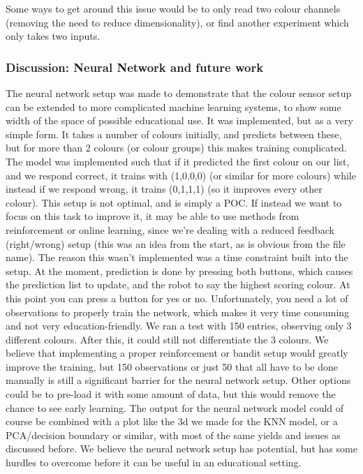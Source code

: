 \documentclass[11pt, a4paper]{article}
\begin{document}
Some ways to get around this issue would be to only read two colour channels (removing the need to reduce dimensionality), or find another experiment which only takes two inputs. 
\subsubsection{Discussion: Neural Network and future work}
The neural network setup was made to demonstrate that the colour sensor setup can be extended to more complicated machine learning systems, to show some width of the space of possible educational use. It was implemented, but as a very simple form. It takes a number of colours initially, and predicts between these, but for more than 2 colours (or colour groups) this makes training complicated. The model was implemented such that if it predicted the first colour on our list, and we respond correct, it trains with (1,0,0,0) (or similar for more colours) while instead if we respond wrong, it trains (0,1,1,1) (so it improves every other colour). This setup is not optimal, and is simply a POC. If instead we want to focus on this task to improve it, it may be able to use methods from reinforcement or online learning, since we're dealing with a reduced feedback (right/wrong) setup (this was an idea from the start, as is obvious from the file name). The reason this wasn't implemented was a time constraint built into the setup. At the moment, prediction is done by pressing both buttons, which causes the prediction list to update, and the robot to say the highest scoring colour. At this point you can press a button for yes or no. Unfortunately, you need a lot of observations to properly train the network, which makes it very time consuming and not very education-friendly. We ran a test with 150 entries, observing only 3 different colours. After this, it could still not differentiate the 3 colours. We believe that implementing a proper reinforcement or bandit setup would greatly improve the training, but 150 observations or just 50 that all have to be done manually is still a significant barrier for the neural network setup. Other options could be to pre-load it with some amount of data, but this would remove the chance to see early learning. The output for the neural network model could of course be combined with a plot like the 3d we made for the KNN model, or a PCA/decision boundary or similar, with most of the same yields and issues as discussed before. We believe the neural network setup has potential, but has some hurdles to overcome before it can be useful in an educational setting.
\end{document}
